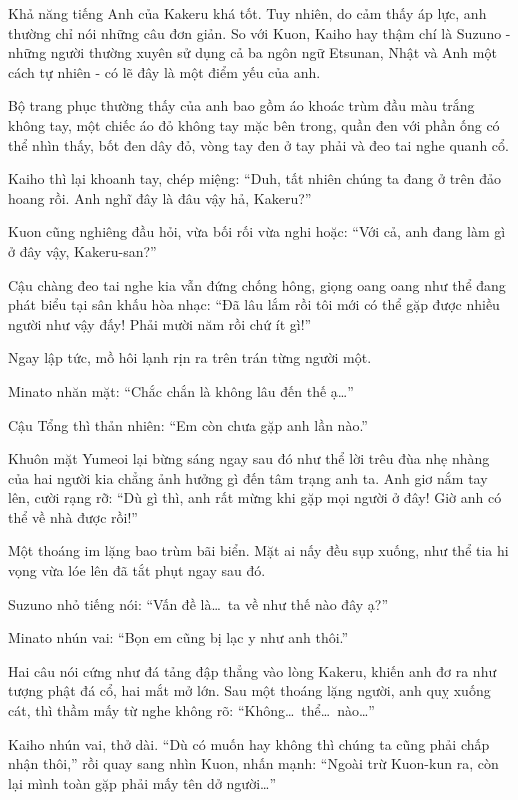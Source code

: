 \documentclass[../main.tex]{subfiles}
\begin{document}
Khả năng tiếng Anh của Kakeru khá tốt. Tuy nhiên, do cảm thấy áp lực, anh thường chỉ nói những câu đơn giản. So với Kuon, Kaiho hay thậm chí là Suzuno - những người thường xuyên sử dụng cả ba ngôn ngữ Etsunan, Nhật và Anh một cách tự nhiên - có lẽ đây là một điểm yếu của anh.

Bộ trang phục thường thấy của anh bao gồm áo khoác trùm đầu màu trắng không tay, một chiếc áo đỏ không tay mặc bên trong, quần đen với phần ống có thể nhìn thấy, bốt đen dây đỏ, vòng tay đen ở tay phải và đeo tai nghe quanh cổ.

\chrint

Kaiho thì lại khoanh tay, chép miệng: ``Duh, tất nhiên chúng ta đang ở trên đảo hoang rồi. Anh nghĩ đây là đâu vậy hả, Kakeru?''

Kuon cũng nghiêng đầu hỏi, vừa bối rối vừa nghi hoặc: ``Với cả, anh đang làm gì ở đây vậy, Kakeru-san?''

Cậu chàng đeo tai nghe kia vẫn đứng chống hông, giọng oang oang như thể đang phát biểu tại sân khấu hòa nhạc: ``Đã lâu lắm rồi tôi mới có thể gặp được nhiều người như vậy đấy! Phải mười năm rồi chứ ít gì!''

Ngay lập tức, mồ hôi lạnh rịn ra trên trán từng người một.

Minato nhăn mặt: ``Chắc chắn là không lâu đến thế ạ\dots''

Cậu Tổng thì thản nhiên: ``Em còn chưa gặp anh lần nào.''

Khuôn mặt Yumeoi lại bừng sáng ngay sau đó như thể lời trêu đùa nhẹ nhàng của hai người kia chẳng ảnh hưởng gì đến tâm trạng anh ta. Anh giơ nắm tay lên, cười rạng rỡ: ``Dù gì thì, anh rất mừng khi gặp mọi người ở đây! Giờ anh có thể về nhà được rồi!''

Một thoáng im lặng bao trùm bãi biển. Mặt ai nấy đều sụp xuống, như thể tia hi vọng vừa lóe lên đã tắt phụt ngay sau đó.

Suzuno nhỏ tiếng nói: ``Vấn đề là\dots\ ta về như thế nào đây ạ?''

Minato nhún vai: ``Bọn em cũng bị lạc y như anh thôi.''

Hai câu nói cứng như đá tảng đập thẳng vào lòng Kakeru, khiến anh đơ ra như tượng phật đá cổ, hai mắt mở lớn. Sau một thoáng lặng người, anh quỵ xuống cát, thì thầm mấy từ nghe không rõ: ``Không\dots\ thể\dots\ nào\dots''

Kaiho nhún vai, thở dài. ``Dù có muốn hay không thì chúng ta cũng phải chấp nhận thôi,'' rồi quay sang nhìn Kuon, nhấn mạnh: ``Ngoài trừ Kuon-kun ra, còn lại mình toàn gặp phải mấy tên dở người\dots''
\end{document}
